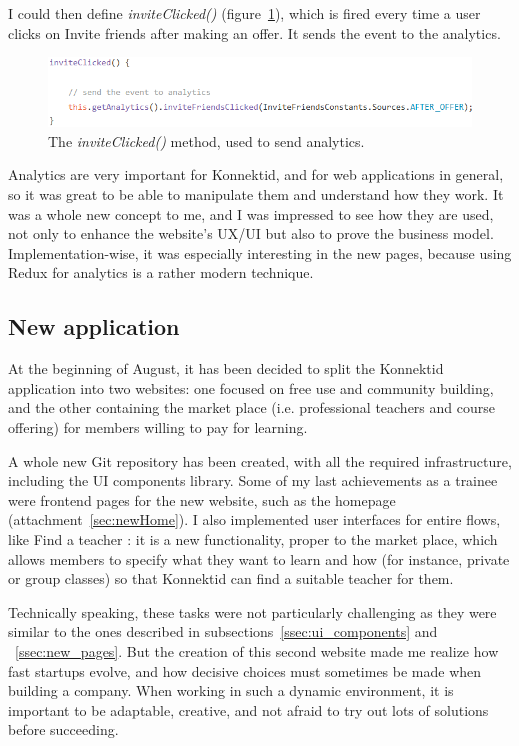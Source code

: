 I could then define \textit{inviteClicked()} ({\sc figure}~\ref{fig:inviteClicked}), which is fired every time a user clicks on \guillemotleft{} Invite friends \guillemotright{} after making an offer. It sends the event to the analytics.

\begin{figure}[H]
    \centering
    \includegraphics{figure/inviteClicked.png}
    \caption{The \textit{inviteClicked()} method, used to send analytics.}
    \label{fig:inviteClicked}
\end{figure}

Analytics are very important for Konnektid, and for web applications in general, so it was great to be able to manipulate them and understand how they work. It was a whole new concept to me, and I was impressed to see how they are used, not only to enhance the website's UX/UI but also to prove the business model. Implementation-wise, it was especially interesting in the new pages, because using Redux for analytics is a rather modern technique.

\subsection{New application}
\label{ssec:newApp}

At the beginning of August, it has been decided to split the Konnektid application into two websites: one focused on free use and community building, and the other containing the market place (i.e. professional teachers and course offering) for members willing to pay for learning.

A whole new Git repository has been created, with all the required infrastructure, including the UI components library. Some of my last achievements as a trainee were frontend pages for the new website, such as the homepage ({\sc attachment}~\ref{sec:newHome}). I also implemented user interfaces for entire flows, like \guillemotleft{} Find a teacher \guillemotright{}: it is a new functionality, proper to the market place, which allows members to specify what they want to learn and how (for instance, private or group classes) so that Konnektid can find a suitable teacher for them.

Technically speaking, these tasks were not particularly challenging as they were similar to the ones described in {\sc subsections}~\ref{ssec:ui_components} and ~\ref{ssec:new_pages}. But the creation of this second website made me realize how fast startups evolve, and how decisive choices must sometimes be made when building a company. When working in such a dynamic environment, it is important to be adaptable, creative, and not afraid to try out lots of solutions before succeeding.
